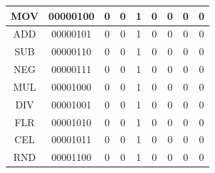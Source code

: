 \documentclass[a4paper,14pt]{article}
\begin{document}
\begin{table}[!h]
\begin{tabular}{lllllllll}
\multicolumn{1}{|c|}{MOV} & \multicolumn{1}{c|}{00000100} & \multicolumn{1}{c|}{0} & \multicolumn{1}{c|}{0} & \multicolumn{1}{c|}{1} & \multicolumn{1}{c|}{0} & \multicolumn{1}{c|}{0} & \multicolumn{1}{c|}{0} & \multicolumn{1}{c|}{0} \TBstrut \\[1em] \hline
\multicolumn{1}{|c|}{ADD} & \multicolumn{1}{c|}{00000101} & \multicolumn{1}{c|}{0} & \multicolumn{1}{c|}{0} & \multicolumn{1}{c|}{1} & \multicolumn{1}{c|}{0} & \multicolumn{1}{c|}{0} & \multicolumn{1}{c|}{0} & \multicolumn{1}{c|}{0} \TBstrut \\[1em] \hline
\multicolumn{1}{|c|}{SUB} & \multicolumn{1}{c|}{00000110} & \multicolumn{1}{c|}{0} & \multicolumn{1}{c|}{0} & \multicolumn{1}{c|}{1} & \multicolumn{1}{c|}{0} & \multicolumn{1}{c|}{0} & \multicolumn{1}{c|}{0} & \multicolumn{1}{c|}{0} \TBstrut \\[1em] \hline
\multicolumn{1}{|c|}{NEG} & \multicolumn{1}{c|}{00000111} & \multicolumn{1}{c|}{0} & \multicolumn{1}{c|}{0} & \multicolumn{1}{c|}{1} & \multicolumn{1}{c|}{0} & \multicolumn{1}{c|}{0} & \multicolumn{1}{c|}{0} & \multicolumn{1}{c|}{0} \TBstrut \\[1em] \hline
\multicolumn{1}{|c|}{MUL} & \multicolumn{1}{c|}{00001000} & \multicolumn{1}{c|}{0} & \multicolumn{1}{c|}{0} & \multicolumn{1}{c|}{1} & \multicolumn{1}{c|}{0} & \multicolumn{1}{c|}{0} & \multicolumn{1}{c|}{0} & \multicolumn{1}{c|}{0} \TBstrut \\[1em] \hline
\multicolumn{1}{|c|}{DIV} & \multicolumn{1}{c|}{00001001} & \multicolumn{1}{c|}{0} & \multicolumn{1}{c|}{0} & \multicolumn{1}{c|}{1} & \multicolumn{1}{c|}{0} & \multicolumn{1}{c|}{0} & \multicolumn{1}{c|}{0} & \multicolumn{1}{c|}{0} \TBstrut \\[1em] \hline
\multicolumn{1}{|c|}{FLR} & \multicolumn{1}{c|}{00001010} & \multicolumn{1}{c|}{0} & \multicolumn{1}{c|}{0} & \multicolumn{1}{c|}{1} & \multicolumn{1}{c|}{0} & \multicolumn{1}{c|}{0} & \multicolumn{1}{c|}{0} & \multicolumn{1}{c|}{0} \TBstrut \\[1em] \hline
\multicolumn{1}{|c|}{CEL} & \multicolumn{1}{c|}{00001011} & \multicolumn{1}{c|}{0} & \multicolumn{1}{c|}{0} & \multicolumn{1}{c|}{1} & \multicolumn{1}{c|}{0} & \multicolumn{1}{c|}{0} & \multicolumn{1}{c|}{0} & \multicolumn{1}{c|}{0} \TBstrut \\[1em] \hline
\multicolumn{1}{|c|}{RND} & \multicolumn{1}{c|}{00001100} & \multicolumn{1}{c|}{0} & \multicolumn{1}{c|}{0} & \multicolumn{1}{c|}{1} & \multicolumn{1}{c|}{0} & \multicolumn{1}{c|}{0} & \multicolumn{1}{c|}{0} & \multicolumn{1}{c|}{0} \TBstrut \\[1em] \hline

\end{tabular}
\end{table}
\end{document}
